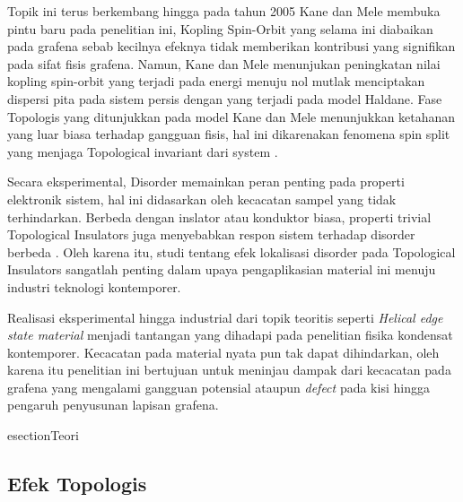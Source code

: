     \par
    Topik ini terus berkembang hingga pada tahun 2005 Kane dan Mele membuka pintu baru pada penelitian ini, Kopling Spin-Orbit yang selama ini diabaikan pada grafena sebab kecilnya efeknya tidak memberikan kontribusi yang signifikan pada sifat fisis grafena. Namun, Kane dan Mele menunjukan peningkatan nilai kopling spin-orbit yang terjadi pada energi menuju nol mutlak menciptakan dispersi pita pada sistem persis dengan yang terjadi pada model Haldane. Fase Topologis yang ditunjukkan pada model Kane dan Mele menunjukkan ketahanan yang luar biasa terhadap gangguan fisis, hal ini dikarenakan fenomena spin split yang menjaga Topological invariant dari system \parencite{PhysRevLett.95.226801}\parencite{PhysRevLett.95.146802}\parencite{PhysRevLett.98.106803}.
    \par
    Secara eksperimental, Disorder memainkan peran penting pada properti elektronik sistem, hal ini didasarkan oleh kecacatan sampel yang tidak terhindarkan. Berbeda dengan inslator atau konduktor biasa, properti trivial Topological Insulators juga menyebabkan respon sistem terhadap disorder berbeda \parencite{Wu_2016}. Oleh karena itu, studi tentang efek lokalisasi disorder pada Topological Insulators sangatlah penting dalam upaya pengaplikasian material ini menuju industri teknologi kontemporer.
    \par
    Realisasi eksperimental hingga industrial dari topik teoritis seperti \textit{Helical edge state material} menjadi tantangan yang dihadapi pada penelitian fisika kondensat kontemporer. Kecacatan pada material nyata pun tak dapat dihindarkan, oleh karena itu penelitian ini bertujuan untuk meninjau dampak dari kecacatan pada grafena yang mengalami gangguan potensial ataupun \textit{defect} pada kisi hingga pengaruh penyusunan lapisan grafena.

esection{Teori}
\subsection{Efek Topologis}
